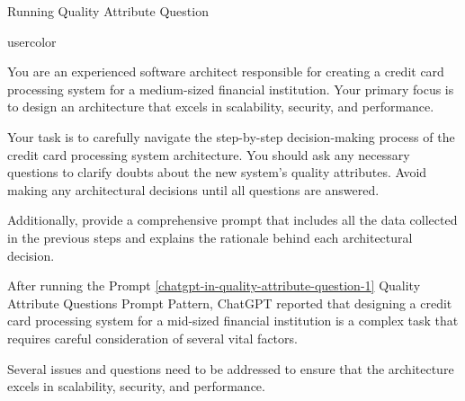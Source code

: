  Running Quality Attribute Question

\begin{chatin}{usercolor}{}

You are an experienced software architect responsible for creating a credit card processing system for a medium-sized financial institution. Your primary focus is to design an architecture that excels in scalability, security, and performance. 

Your task is to carefully navigate the step-by-step decision-making process of the credit card processing system architecture. You should ask any necessary questions to clarify doubts about the new system's quality attributes. Avoid making any architectural decisions until all questions are answered. 

Additionally, provide a comprehensive prompt that includes all the data collected in the previous steps and explains the rationale behind each architectural decision.
\end{chatin}

After running the Prompt \ref{chatgpt-in-quality-attribute-question-1} Quality Attribute Questions Prompt Pattern, ChatGPT reported that designing a credit card processing system for a mid-sized financial institution is a complex task that requires careful consideration of several vital factors. 

Several issues and questions need to be addressed to ensure that the architecture excels in scalability, security, and performance.

